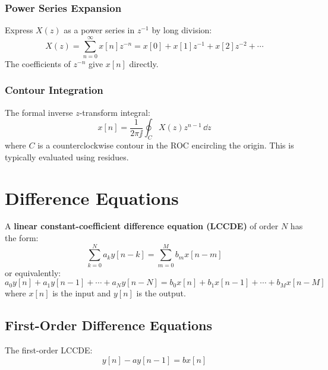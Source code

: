\subsubsection{Power Series Expansion}
Express $X(z)$ as a power series in $z^{-1}$ by long division:
\begin{equation}
X(z) = \sum_{n=0}^{\infty} x[n] z^{-n} = x[0] + x[1]z^{-1} + x[2]z^{-2} + \cdots
\end{equation}
The coefficients of $z^{-n}$ give $x[n]$ directly.

\subsubsection{Contour Integration}
The formal inverse $z$-transform integral:
\begin{equation}
x[n] = \frac{1}{2\pi\jj} \oint_C X(z) z^{n-1} \, \dd z
\end{equation}
where $C$ is a counterclockwise contour in the ROC encircling the origin. This is typically evaluated using residues.

\section{Difference Equations}

\begin{definitionbox}[title=Definition: Linear Constant-Coefficient Difference Equation]
A \textbf{linear constant-coefficient difference equation (LCCDE)} of order $N$ has the form:
\begin{equation}
\sum_{k=0}^{N} a_k y[n-k] = \sum_{m=0}^{M} b_m x[n-m]
\end{equation}
or equivalently:
\begin{equation}
a_0 y[n] + a_1 y[n-1] + \cdots + a_N y[n-N] = b_0 x[n] + b_1 x[n-1] + \cdots + b_M x[n-M]
\end{equation}
where $x[n]$ is the input and $y[n]$ is the output.
\end{definitionbox}

\subsection{First-Order Difference Equations}

The first-order LCCDE:
\begin{equation}
y[n] - ay[n-1] = bx[n]
\end{equation}

